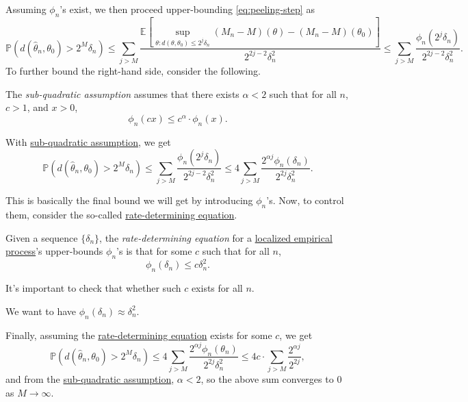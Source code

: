 Assuming \(\phi _n\)'s exist, we then proceed upper-bounding \autoref{eq:peeling-step} as
\[
	\mathbb{P} (d(\hat{\theta} _n, \theta _0) > 2^M \delta _n)
	\leq \sum_{j > M} \frac{\mathbb{E}_{}\left[\sup _{\theta \colon d(\theta , \theta _0) \leq 2^j \delta _n} (M_n - M)(\theta ) - (M_n - M)(\theta _0) \right] }{2^{2j - 2} \delta _n^2 }
	\leq \sum_{j > M} \frac{\phi _n(2^j \delta _n)}{2^{2j - 2} \delta _n^2}.
\]
To further bound the right-hand side, consider the following.

\begin{definition}\label{def:sub-quadratic-assumption}
	The \emph{sub-quadratic assumption} assumes that there exists \(\alpha < 2\) such that for all \(n\), \(c > 1\), and \(x > 0\),
	\[
		\phi _n(cx) \leq c^\alpha \cdot \phi _n(x).
	\]
\end{definition}

With \hyperref[def:sub-quadratic-assumption]{sub-quadratic assumption}, we get
\[
	\mathbb{P} (d(\hat{\theta} _n, \theta _0) > 2^M \delta _n)
	\leq \sum_{j > M} \frac{\phi _n(2^j \delta _n)}{2^{2j - 2} \delta _n^2}
	\leq 4 \sum_{j > M} \frac{2^{\alpha j} \phi _n(\delta _n)}{2^{2j} \delta _n^2}.
\]

This is basically the final bound we will get by introducing \(\phi _n\)'s. Now, to control them, consider the so-called \hyperref[def:rate-determining-equation]{rate-determining equation}.

\begin{definition}\label{def:rate-determining-equation}
	Given a sequence \(\{ \delta _n \} \), the \emph{rate-determining equation} for a \hyperref[def:localized-EP]{localized empirical process}'s upper-bounds \(\phi _n\)'s is that for some \(c\) such that for all \(n\),
	\[
		\phi _n(\delta _n) \leq c \delta _n^2.
	\]
\end{definition}

\begin{remark}
	It's important to check that whether such \(c\) exists for all \(n\).
\end{remark}

\begin{intuition}
	We want to have \(\phi _n(\delta _n) \approx \delta _n^2\).
\end{intuition}

Finally, assuming the \hyperref[def:rate-determining-equation]{rate-determining equation} exists for some \(c\), we get
\[
	\mathbb{P} (d(\hat{\theta} _n, \theta _0) > 2^M \delta _n)
	\leq 4 \sum_{j > M} \frac{2^{\alpha j} \phi _n(\theta _n)}{2^{2j} \delta _n^2}
	\leq 4c\cdot \sum_{j > M} \frac{2^{\alpha j}}{2^{2j}} ,
\]
and from the \hyperref[def:sub-quadratic-assumption]{sub-quadratic assumption}, \(\alpha < 2\), so the above sum converges to \(0\) as \(M \to \infty \).

